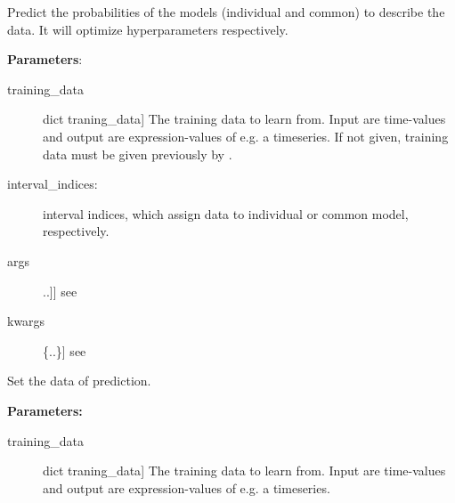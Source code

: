 \documentclass[letterpaper,10pt]{sphinxmanual}
\begin{document}
\begin{fulllineitems}
\begin{fulllineitems}
\end{fulllineitems}


\begin{fulllineitems}
\label{base:gptwosample.twosample.twosample_base.TwoSampleBase.predict_model_likelihoods}
Predict the probabilities of the models (individual and common) to describe the data.
It will optimize hyperparameters respectively.

\textbf{Parameters}:
\begin{description}
\item[{training\_data}] \leavevmode{[}dict traning\_data{]}
The training data to learn from. Input are time-values and
output are expression-values of e.g. a timeseries.
If not given, training data must be given previously by
.

\item[{interval\_indices: {\hyperref[data:gptwosample.data.data_base.get_model_structure]{}}}] \leavevmode
interval indices, which assign data to individual or common model,
respectively.

\item[{args}] \leavevmode{[}{[}..{]}{]}
see 

\item[{kwargs}] \leavevmode{[}\{..\}{]}
see 

\end{description}

\end{fulllineitems}


\begin{fulllineitems}
\label{base:gptwosample.twosample.twosample_base.TwoSampleBase.set_data}
Set the data of prediction.

\textbf{Parameters:}
\begin{description}
\item[{training\_data}] \leavevmode{[}dict traning\_data{]}
The training data to learn from. Input are time-values and
output are expression-values of e.g. a timeseries.


\end{description}
\end{fulllineitems}
\end{fulllineitems}
\end{document}
